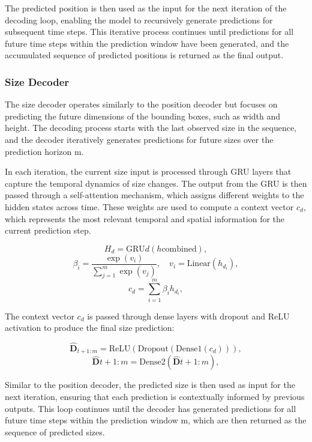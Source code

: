 \documentclass[12pt,oneside]{book} %
\begin{document}
The predicted position is then used as the input for the next iteration of the
decoding loop, enabling the model to recursively generate predictions for
subsequent time steps. This iterative process continues until predictions for
all future time steps within the prediction window have been generated, and the
accumulated sequence of predicted positions is returned as the final output.

\subsubsection{Size Decoder}
The size decoder operates similarly to the position decoder but focuses on
predicting the future dimensions of the bounding boxes, such as width and
height. The decoding process starts with the last observed size in the
sequence, and the decoder iteratively generates predictions for future sizes
over the prediction horizon m.

In each iteration, the current size input is processed through GRU layers that
capture the temporal dynamics of size changes. The output from the GRU is then
passed through a self-attention mechanism, which assigns different weights to
the hidden states across time. These weights are used to compute a context
vector $c_d$, which represents the most relevant temporal and spatial
information for the current prediction step.

\begin{equation}
    H_d = \text{GRU}d(h{\text{combined}}),
\end{equation}
\begin{equation}
    \beta_i = \frac{\exp(v_i)}{\sum_{j=1}^{m}\exp(v_j)}, \quad v_i = \text{Linear}(h_{d_i}),
\end{equation}
\begin{equation}
    c_d = \sum_{i=1}^{m} \beta_i h_{d_i},
\end{equation}

The context vector $c_d$ is passed through dense layers with dropout and ReLU
activation to produce the final size prediction:

\begin{equation}
    \hat{\mathbf{D}}_{t+1:m} = \text{ReLU}(\text{Dropout}(\text{Dense}1(c_d))),
\end{equation}
\begin{equation}
    \hat{\mathbf{D}}{t+1:m} = \text{Dense}2(\hat{\mathbf{D}}{t+1:m}),
\end{equation}

Similar to the position decoder, the predicted size is then used as input for
the next iteration, ensuring that each prediction is contextually informed by
previous outputs. This loop continues until the decoder has generated
predictions for all future time steps within the prediction window m, which are
then returned as the sequence of predicted sizes.
\end{document}
